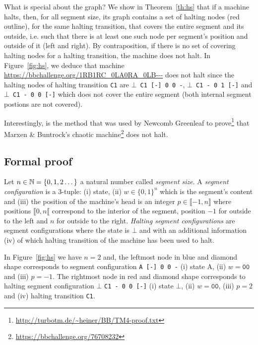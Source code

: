 What is special about the \HS graph? We show in Theorem~\ref{th:hs} that if a machine halts, then, for all segment size, its \HS graph contains a set of halting nodes (red outline), for the same halting transition, that covers the entire segment and its outside, i.e. such that there is at least one such node per segment's position and outside of it (left and right). By contraposition, if there is no set of covering halting nodes for a halting transition, the machine does not halt. In Figure~\ref{fig:hs}, we deduce that machine \url{https://bbchallenge.org/1RB1RC_0LA0RA_0LB---} does not halt since the halting nodes of halting transition \texttt{C1} are \texttt{$\bot$ C1 [-] 0 0 -}, \texttt{$\bot$ C1 - 0 1 [-]} and \texttt{$\bot$ C1 - 0 0 [-]} which does not cover the entire segment (both internal segment postions are not covered).

Interestingly, \HS is the method that was used by Newcomb Greenleaf to prove\footnote{\url{http://turbotm.de/~heiner/BB/TM4-proof.txt}} that Marxen \& Buntrock's chaotic machine\footnote{\url{https://bbchallenge.org/76708232}} \cite{Marxen_1998} does not halt.

\subsection{Formal proof}

\begin{definition}\label{def:hs-conf}
  Let $n \in \mathbb{N} = \{0, 1, 2 \dots\}$ a natural number called \textit{segment size}. A \textit{segment configuration} is a 3-tuple: (i) state, (ii) $w \in \{0,1\}^n$ which is the segment's content and (iii) the position of the machine's head is an integer $p \in \llbracket -1, n \rrbracket$ where positions $\llbracket 0,n \llbracket$ correspond to the interior of the segment, position $-1$ for outside to the left and $n$ for outside to the right. \textit{Halting segment configurations} are segment configurations where the state is $\bot$ and with an additional information (iv) of which halting transition of the machine has been used to halt.
\end{definition}

\begin{example}
  In Figure~\ref{fig:hs} we have $n=2$ and, the leftmost node in blue and diamond shape corresponds to segment configuration \texttt{A [-] 0 0 -} (i) state A, (ii) $w = \texttt{00}$ and (iii) $p = -1$. The rightmost node in red and diamond shape corresponds to halting segment configuration $\bot$ \texttt{C1 - 0 0 [-]} (i) state $\bot$, (ii) $w = \texttt{00}$, (iii) $p = 2$ and (iv) halting transition \texttt{C1}.
\end{example}

